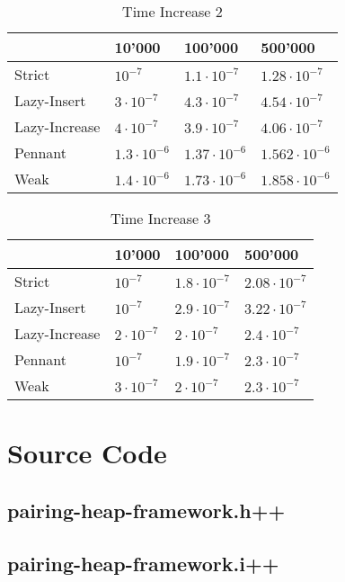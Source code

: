 \documentclass{DIKU-article}[2010/01/13]
\begin{document}
\begin{table}[h!]
\centering
\caption{Time Increase 2}
\begin{tabular}{l|lll}
& 10'000 & 100'000 & 500'000 \\
\hline
Strict & $10^{-7}$ & $1.1\cdot 10^{-7}$ & $1.28\cdot 10^{-7}$\\
Lazy-Insert & $3\cdot 10^{-7}$ & $4.3\cdot 10^{-7}$ & $4.54\cdot 10^{-7}$\\
Lazy-Increase & $4\cdot 10^{-7}$ & $3.9\cdot 10^{-7}$ & $4.06\cdot 10^{-7}$\\
Pennant & $1.3\cdot 10^{-6}$ & $1.37\cdot 10^{-6}$ & $1.562\cdot 10^{-6}$\\
Weak & $1.4\cdot 10^{-6}$ & $1.73\cdot 10^{-6}$ & $1.858\cdot 10^{-6}$

\end{tabular}
\end{table}

\begin{table}[h!]
\centering
\caption{Time Increase 3}
\begin{tabular}{l|lll}
\label{tab:time.last}
& 10'000 & 100'000 & 500'000 \\
\hline
Strict & $10^{-7}$ & $1.8\cdot 10^{-7}$ & $2.08\cdot 10^{-7}$\\
Lazy-Insert & $10^{-7}$ & $2.9\cdot 10^{-7}$ & $3.22\cdot 10^{-7}$\\
Lazy-Increase & $2\cdot 10^{-7}$ & $2\cdot 10^{-7}$ & $2.4\cdot 10^{-7}$\\
Pennant & $10^{-7}$ & $1.9\cdot 10^{-7}$ & $2.3\cdot 10^{-7}$\\
Weak & $3\cdot 10^{-7}$ & $2\cdot 10^{-7}$ & $2.3\cdot 10^{-7}$


\end{tabular}
\end{table}


\clearpage


\section{Source Code}
\subsection{pairing-heap-framework.h++}


\subsection{pairing-heap-framework.i++}

\end{document}
